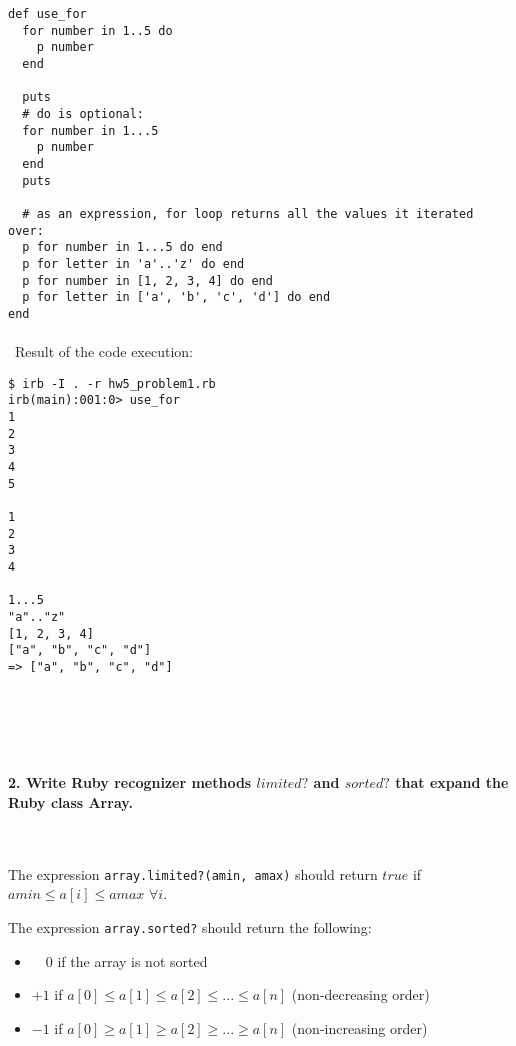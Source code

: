 \documentclass{article}
\begin{document}
\begin{verbatim}
def use_for
  for number in 1..5 do
    p number
  end

  puts
  # do is optional:
  for number in 1...5
    p number
  end
  puts
  
  # as an expression, for loop returns all the values it iterated over:
  p for number in 1...5 do end
  p for letter in 'a'..'z' do end
  p for number in [1, 2, 3, 4] do end
  p for letter in ['a', 'b', 'c', 'd'] do end
end
\end{verbatim}

\paragraph{}\
Result of the code execution:

\begin{verbatim} 
$ irb -I . -r hw5_problem1.rb
irb(main):001:0> use_for
1
2
3
4
5

1
2
3
4

1...5
"a".."z"
[1, 2, 3, 4]
["a", "b", "c", "d"]
=> ["a", "b", "c", "d"]
\end{verbatim}


\paragraph{}\
\paragraph{}\


	\paragraph{2. Write Ruby recognizer methods \(limited?\) and \(sorted?\) that expand the Ruby class Array.}\ \newline
	
	The expression \texttt{array.limited?(amin, amax)} should return \(true\) if  \(amin  \leqslant  a[i]  \leqslant  amax\) \(\forall i\). \newline
	
	The expression \texttt{array.sorted?} should return the following: 
	\begin{itemize}
		\item \ \ \(0\) \quad  if the array is not sorted
		\item \(+1\) \quad if \(a[0] \leqslant a[1] \leqslant a[2] \leqslant ... \leqslant a[n]\) (non-decreasing order)
		\item \(-1\) \quad if \(a[0] \geqslant a[1] \geqslant a[2] \geqslant ... \geqslant a[n]\) (non-increasing order)
	\end{itemize}
	
\end{document}
